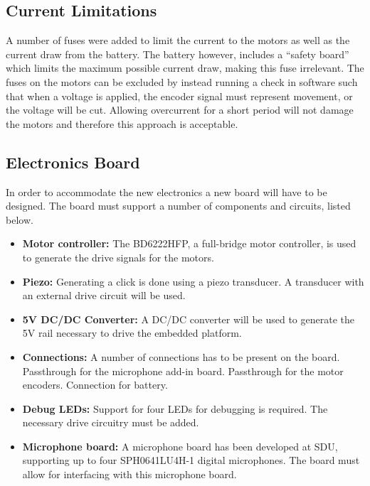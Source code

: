 \subsection{Current Limitations} %
\label{sub:power_and_current_limitations}
A number of fuses were added to limit the current to the motors as well as the current draw from the battery.
The battery however, includes a ``safety board'' which limits the maximum possible current draw, making this fuse irrelevant.
The fuses on the motors can be excluded by instead running a check in software such that when a voltage is applied, the encoder signal must represent movement, or the voltage will be cut.
Allowing overcurrent for a short period will not damage the motors and therefore this approach is acceptable.

\subsection{Electronics Board} %
\label{sub:electronics_board}
In order to accommodate the new electronics a new board will have to be designed.
The board must support a number of components and circuits, listed below.
\begin{itemize}
	\item \textbf{Motor controller:} The BD6222HFP, a full-bridge motor controller, is used to generate the drive signals for the motors.
	\item \textbf{Piezo:} Generating a click is done using a piezo transducer.
	A transducer with an external drive circuit will be used.
	\item \textbf{5V DC/DC Converter:} A DC/DC converter will be used to generate the 5V rail necessary to drive the embedded platform.
	\item \textbf{Connections:} A number of connections has to be present on the board.
	Passthrough for the microphone add-in board.
	Passthrough for the motor encoders.
	Connection for battery.
	\item \textbf{Debug LEDs:} Support for four LEDs for debugging is required.
	The necessary drive circuitry must be added.
	\item \textbf{Microphone board:} A microphone board has been developed at SDU, supporting up to four SPH0641LU4H-1 digital microphones. The board must allow for interfacing with this microphone board.
\end{itemize}

